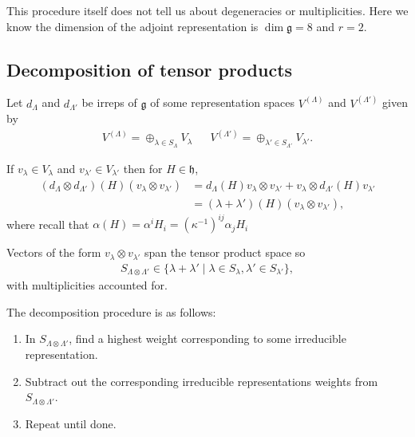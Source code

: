 This procedure itself does not tell us about degeneracies or multiplicities. Here we know the dimension of the adjoint representation is $\dim \mathfrak{g} = 8$ and $r = 2$.

\subsection{Decomposition of tensor products}

Let $d_\Lambda$ and $d_{\Lambda'}$ be irreps of $\mathfrak{g}$ of some representation spaces $V^{\left( \Lambda \right) }$ and $V^{\left( \Lambda' \right) }$ given by
\begin{align}
    V^{\left( \Lambda \right) } = \oplus_{\lambda \in S_\Lambda} V_\lambda && V^{\left( \Lambda' \right) } = \oplus_{\lambda' \in S_{\Lambda'}} V_{\lambda'}
.\end{align}

If $v_\lambda \in V_\lambda$ and $v_{\lambda'} \in V_{\lambda'}$ then for $H \in \mathfrak{h}$,
\begin{align}
    \left( d_{\Lambda} \otimes d_{\Lambda'} \right) \left( H \right) \left( v_{\lambda} \otimes v_{\lambda'} \right)  &= d_{\Lambda}\left( H \right) v_{\lambda} \otimes v_{\lambda'} + v_{\lambda} \otimes d_{\Lambda'}\left( H \right) v_{\lambda'} \\
    &= \left( \lambda + \lambda' \right) \left( H \right) \left( v_{\lambda} \otimes v_{\lambda'} \right) 
,\end{align}
where recall that $\alpha \left( H \right) = \alpha^{i} H_i = \left( \kappa^{-1} \right)^{ij} \alpha_j H_i$

Vectors of the form $v_\lambda \otimes v_{\lambda'}$ span the tensor product space so
\begin{align}
    S_{\Lambda \otimes \Lambda'} \in \{\lambda + \lambda'  \mid \lambda \in S_\lambda, \lambda' \in S_{\lambda'}\} 
,\end{align}
with multiplicities accounted for.

The decomposition procedure is as follows:
\begin{enumerate}
    \item In $S_{\Lambda \otimes \Lambda'}$, find a highest weight corresponding to some irreducible representation.
    \item Subtract out the corresponding irreducible representations weights from $S_{\Lambda \otimes \Lambda'}$.
    \item Repeat until done.
\end{enumerate}

